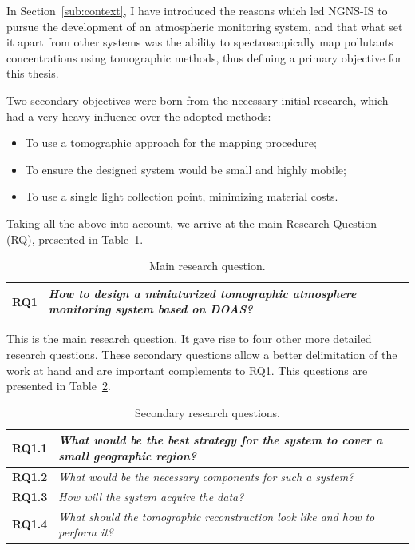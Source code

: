 In Section~\ref{sub:context}, I have introduced the reasons which led
NGNS-IS to pursue the development of an atmospheric monitoring system,
and that what set it apart from other systems was the ability to
spectroscopically map pollutants concentrations using tomographic
methods, thus defining a primary objective for this thesis.

Two secondary objectives were born from the necessary initial research,
which had a very heavy influence over the adopted methods:
\begin{itemize}
    \item To use a tomographic approach for the mapping procedure;
    \item To ensure the designed system would be small and highly
        mobile;
    \item To use a single light collection point, minimizing material
        costs.
\end{itemize}

Taking all the above into account, we arrive at the main Research
Question (\gls{RQ}), presented in Table~\ref{tab:RQ1}.
\begin{table}[htpb]
    \centering
    \caption{Main research question.}
    \label{tab:RQ1}
    \begin{tabularx}{0.8\textwidth}{cX}
        \toprule
        \textbf{RQ1}&\emph{ How to design a miniaturized tomographic
        atmosphere monitoring system based on DOAS? }\\
        \bottomrule
    \end{tabularx}
\end{table}

This is the main research question. It gave rise to four other more
detailed research questions. These secondary questions allow a better
delimitation of the work at hand and are important complements to RQ1.
This questions are presented in Table~\ref{tab:sec_RQ}.

\begin{table}[htpb]
    \centering
    \caption{Secondary research questions.}
    \label{tab:sec_RQ}
    \begin{tabularx}{0.8\textwidth}{cX}
        \toprule
        \textbf{RQ1.1}&\emph{ What would be the best strategy
        for the system to cover a small geographic region? }\\
        \midrule
        \textbf{RQ1.2}&\emph{ What would be the necessary
        components for such a system? }\\
        \midrule
        \textbf{RQ1.3}&\emph{ How will the system acquire the
        data? }\\
        \midrule
        \textbf{RQ1.4}&\emph{ What should the tomographic
        reconstruction look like and how to perform it? }\\
        \bottomrule
    \end{tabularx}
\end{table}


